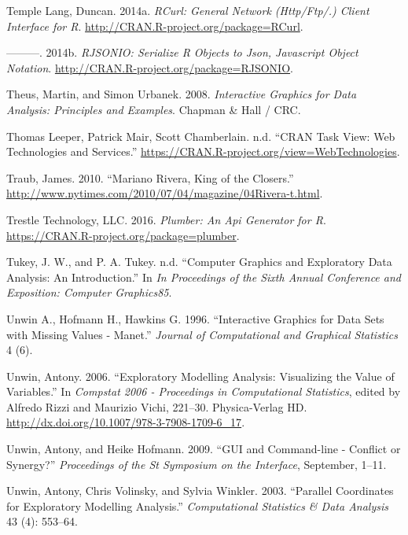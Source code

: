 \documentclass[12pt,]{isuthesis}
\begin{document}
\hypertarget{ref-RCurl}{}
Temple Lang, Duncan. 2014a. \emph{RCurl: General Network (Http/Ftp/.)
Client Interface for R}. \url{http://CRAN.R-project.org/package=RCurl}.

\hypertarget{ref-RJSONIO}{}
---------. 2014b. \emph{RJSONIO: Serialize R Objects to Json, Javascript
Object Notation}. \url{http://CRAN.R-project.org/package=RJSONIO}.

\hypertarget{ref-mondrianbook}{}
Theus, Martin, and Simon Urbanek. 2008. \emph{Interactive Graphics for
Data Analysis: Principles and Examples}. Chapman \& Hall / CRC.

\hypertarget{ref-WebServices}{}
Thomas Leeper, Patrick Mair, Scott Chamberlain. n.d. ``CRAN Task View:
Web Technologies and Services.''
\url{https://CRAN.R-project.org/view=WebTechnologies}.

\hypertarget{ref-NYT}{}
Traub, James. 2010. ``Mariano Rivera, King of the Closers.''
\url{http://www.nytimes.com/2010/07/04/magazine/04Rivera-t.html}.

\hypertarget{ref-plumber}{}
Trestle Technology, LLC. 2016. \emph{Plumber: An Api Generator for R}.
\url{https://CRAN.R-project.org/package=plumber}.

\hypertarget{ref-scagnostics-tukey}{}
Tukey, J. W., and P. A. Tukey. n.d. ``Computer Graphics and Exploratory
Data Analysis: An Introduction.'' In \emph{In Proceedings of the Sixth
Annual Conference and Exposition: Computer Graphics85}.

\hypertarget{ref-MANET}{}
Unwin A., Hofmann H., Hawkins G. 1996. ``Interactive Graphics for Data
Sets with Missing Values - Manet.'' \emph{Journal of Computational and
Graphical Statistics} 4 (6).

\hypertarget{ref-Unwin:2006}{}
Unwin, Antony. 2006. ``Exploratory Modelling Analysis: Visualizing the
Value of Variables.'' In \emph{Compstat 2006 - Proceedings in
Computational Statistics}, edited by Alfredo Rizzi and Maurizio Vichi,
221--30. Physica-Verlag HD.
\url{http://dx.doi.org/10.1007/978-3-7908-1709-6_17}.

\hypertarget{ref-Unwin:1999vp}{}
Unwin, Antony, and Heike Hofmann. 2009. ``GUI and Command-line -
Conflict or Synergy?'' \emph{Proceedings of the St Symposium on the
Interface}, September, 1--11.

\hypertarget{ref-Unwin:2003uy}{}
Unwin, Antony, Chris Volinsky, and Sylvia Winkler. 2003. ``Parallel
Coordinates for Exploratory Modelling Analysis.'' \emph{Computational
Statistics \& Data Analysis} 43 (4): 553--64.
\end{document}
